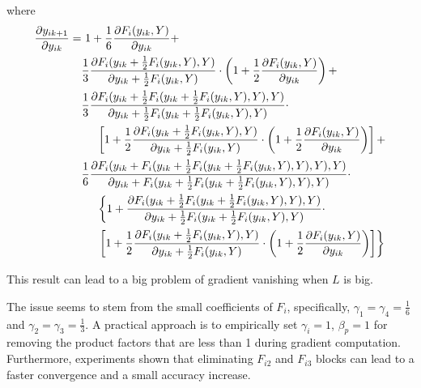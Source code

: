 \documentclass[12pt,a4paper]{report}
\begin{document}
where
\begin{align}\label{eq:5}
  \frac{\partial y_{ik+1}}{\partial y_{ik}} = & \ 1 + \frac{1}{6}\frac{\partial F_i(y_{ik}, Y)}{\partial y_{ik}} \notag  +                                                                                                                                                                         \\
                                              & \frac{1}{3}\frac{\partial F_i(y_{ik} + \frac{1}{2}F_i(y_{ik}, Y), Y)}{\partial y_{ik} + \frac{1}{2}F_i(y_{ik}, Y)} \cdot \left( 1 + \frac{1}{2}\frac{\partial F_i(y_{ik}, Y)}{\partial y_{ik}} \right) \notag +                                    \\
                                              & \frac{1}{3}\frac{\partial F_i(y_{ik} + \frac{1}{2}F_i(y_{ik} + \frac{1}{2}F_i(y_{ik}, Y), Y), Y)}{\partial y_{ik} + \frac{1}{2}F_i(y_{ik} + \frac{1}{2}F_i(y_{ik}, Y), Y)} \cdot \notag                                                            \\
                                              & \ \ \ \ \left[ 1 + \frac{1}{2}\frac{\partial F_i(y_{ik} + \frac{1}{2}F_i(y_{ik}, Y), Y)}{\partial y_{ik} + \frac{1}{2}F_i(y_{ik}, Y)} \cdot \left( 1 + \frac{1}{2}\frac{\partial F_i(y_{ik}, Y)}{\partial y_{ik}} \right)\right] \notag +          \\
                                              & \frac{1}{6}\frac{\partial F_i(y_{ik} + F_i(y_{ik} + \frac{1}{2}F_i(y_{ik} + \frac{1}{2}F_i(y_{ik}, Y), Y), Y), Y)}{\partial y_{ik} + F_i(y_{ik} + \frac{1}{2}F_i(y_{ik} + \frac{1}{2}F_i(y_{ik}, Y), Y), Y)} \cdot \notag                          \\
                                              & \ \ \ \ \left\{ 1 + \frac{\partial F_i(y_{ik} + \frac{1}{2}F_i(y_{ik} + \frac{1}{2}F_i(y_{ik}, Y), Y), Y)}{\partial y_{ik} + \frac{1}{2}F_i(y_{ik} + \frac{1}{2}F_i(y_{ik}, Y), Y)} \cdot \right. \notag                                           \\
                                              & \ \ \ \ \left. \left[ 1 + \frac{1}{2} \frac{\partial F_i(y_{ik} + \frac{1}{2}F_i(y_{ik}, Y), Y)}{\partial y_{ik} + \frac{1}{2}F_i(y_{ik}, Y)} \cdot \left( 1 + \frac{1}{2}\frac{\partial F_i(y_{ik}, Y)}{\partial y_{ik}} \right) \right] \right\}
\end{align}

This result can lead to a big problem of gradient vanishing when $L$ is big.

The issue seems to stem from the small coefficients of $F_i$, specifically, $\gamma_1 = \gamma_4 = \frac{1}{6}$ and $\gamma_2 = \gamma_3 = \frac{1}{3}$. A practical approach is to empirically set $\gamma_i = 1$, $\beta_p = 1$ for removing the product factors that are less than 1 during gradient computation. Furthermore, experiments shown that eliminating $F_{i2}$ and $F_{i3}$ blocks can lead to a faster convergence and a small accuracy increase.
\end{document}
